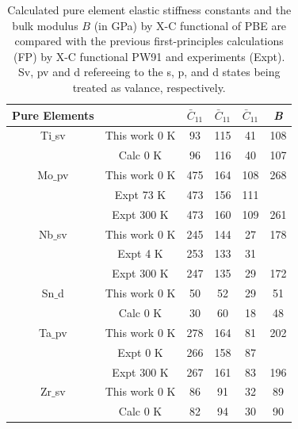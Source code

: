\newpage
\begin{table}[H]
	\caption{Calculated pure element elastic stiffness constants and the bulk modulus $B$ (in GPa) by X-C functional of PBE are compared with the previous first-principles calculations (FP) by X-C functional PW91 and experiments (Expt). Sv, pv and d refereeing to the s, p, and d states being treated as valance, respectively.}
	\centering
	\begin{tabular}{ c c c c c c }
		\hline
		Pure Elements & & $\bar{C}_{11}$ & $\bar{C}_{11}$  & $\bar{C}_{11}$ & \textit{B}\\
		\hline
		Ti$\_$sv & This work 0 K & 93 & 115 & 41 & 108\\
		& Calc 0 K \cite{Shang2010b} & 96 & 116 & 40 & 107\\
		Mo$\_$pv & This work 0 K & 475 & 164 & 108 & 268\\
		& Expt 73 K \cite{Simmons1971b} & 473 & 156 & 111 &\\
		& Expt 300 K \cite{Dickinson1967a} & 473 & 160 & 109 & 261\\
		Nb$\_$sv & This work 0 K & 245 & 144 & 27 & 178\\
		& Expt 4 K \cite{Simmons1971b} & 253 & 133 & 31 & \\
		& Expt 300 K \cite{Bolef1961} & 247 & 135 & 29 & 172\\
		Sn$\_$d & This work 0 K & 50 & 52 & 29 & 51\\
		& Calc 0 K \cite{Shang2010b} & 30 & 60 & 18 & 48\\
		Ta$\_$pv & This work 0 K & 278 & 164 & 81 & 202\\
		& Expt 0 K \cite{Simmons1971b} & 266 & 158 & 87 & \\
		& Expt 300 K \cite{Bolef1961} & 267 & 161 & 83 & 196\\
		Zr$\_$sv & This work 0 K & 86 & 91 & 32 & 89\\
		& Calc 0 K \cite{Shang2010b} & 82 & 94 & 30 & 90\\
		\hline
	\end{tabular}
	\label{Ch5-table:pureeleelas}
\end{table}
\clearpage

